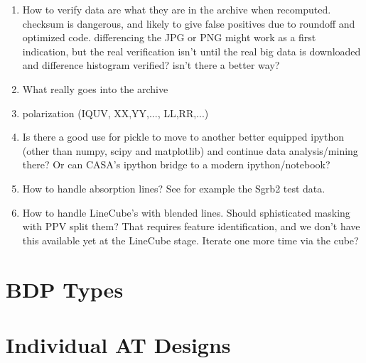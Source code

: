 \documentclass[preprint]{aastex}
\begin{document}
\begin{enumerate}
\item
How to verify data are what they are in the archive when
recomputed. checksum is dangerous, and likely to give false positives due
to roundoff and optimized code.  differencing the JPG or PNG might work as
a first indication, but the real verification isn't until the real big data
is downloaded and difference histogram verified? isn't there a better way?

\item 
What really goes into the archive

\item
polarization (IQUV, XX,YY,...,  LL,RR,...)

\item
Is there a good use for pickle to move to another better equipped ipython
(other than numpy, scipy and matplotlib) and continue data analysis/mining
there? Or can CASA's ipython bridge to a modern ipython/notebook?

\item 
How to handle absorption lines? See for example the Sgrb2 test data.

\item
How to handle LineCube's with blended lines. Should sphisticated masking
with PPV split them?  That requires feature identification, and we don't
have this available yet at the LineCube stage. Iterate one more time via
the cube?


\end{enumerate}


\section{BDP Types}\label{s-bdptypes}



















\clearpage

\section{Individual AT Designs}\label{s-atdesign}




%
%


%
%
%
\end{document}
